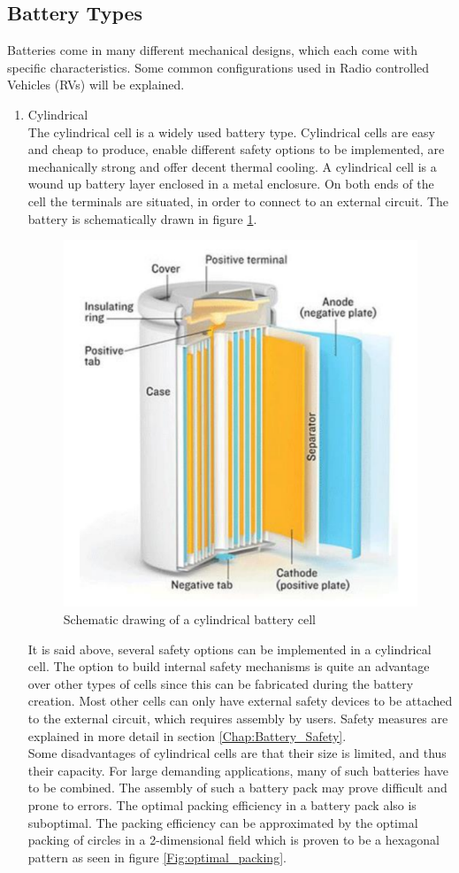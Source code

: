 \subsection{Battery Types}
Batteries come in many different mechanical designs, which each come with specific characteristics. Some common configurations used in Radio controlled Vehicles (RVs) will be explained.
\begin{enumerate}
\item Cylindrical\\
The cylindrical cell is a widely used battery type. Cylindrical cells are easy and cheap to produce, enable different safety options to be implemented, are mechanically strong and offer decent thermal cooling. A cylindrical cell is a wound up battery layer enclosed in a metal enclosure. On both ends of the cell the terminals are situated, in order to connect to an external circuit. The battery is schematically drawn in figure \ref{Fig:Cylindrical_Cell}. 
\begin{figure} [H]
 	\centering	\includegraphics[width=0.5\linewidth]{Figures/cylindrical.PNG}
 	\caption{Schematic drawing of a cylindrical battery cell}
    \label{Fig:Cylindrical_Cell}
\end{figure}
It is said above, several safety options can be implemented in a cylindrical cell. The option to build internal safety mechanisms is quite an advantage over other types of cells since this can be fabricated during the battery creation. Most other cells can only have external safety devices to be attached to the external circuit, which requires assembly by users. Safety measures are explained in more detail in section \ref{Chap:Battery_Safety}. \\
Some disadvantages of cylindrical cells are that their size is limited, and thus their capacity. For large demanding applications, many of such batteries have to be combined. The assembly of such a battery pack may prove difficult and prone to errors. The optimal packing efficiency in a battery pack also is suboptimal. The packing efficiency can be approximated by the optimal packing of circles in a 2-dimensional field which is proven to be a hexagonal pattern \cite{optimal_packing} as seen in figure \ref{Fig:optimal_packing}.

\end{enumerate}
